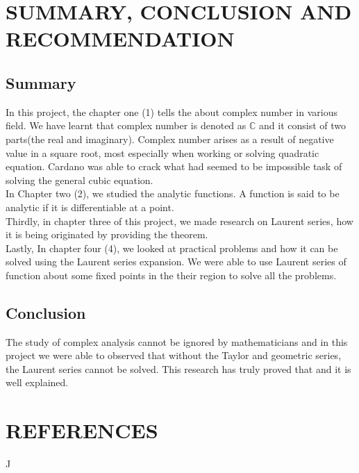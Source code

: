 \documentclass[11pt]{report}
\newcommand{\NI}{\noindent}
\newcommand{\complex}{\mathbb{C}}
\begin{document}
	
	\chapter{SUMMARY, CONCLUSION AND RECOMMENDATION}
	\section{Summary}
	In this project, the chapter one (1) tells the about complex number in various field. We have learnt that complex number is denoted as $\complex$ and it consist of two parts(the real and imaginary). Complex number arises as a result of negative value in a square root, most especially when working or solving quadratic equation. Cardano was able to crack what had seemed to be impossible task of solving the general cubic equation.\\
	
	\NI In Chapter two (2), we studied the analytic functions. A function is said to be analytic if it is differentiable at a point.\\
	
	\NI Thirdly, in chapter three of this project, we made research on Laurent series, how it is being originated by providing the theorem.\\
	
	\NI Lastly, In chapter four (4), we looked at practical problems and how it can be solved using the Laurent series expansion. We were able to use Laurent series of function about some fixed points in the their region to solve all the problems.
	\section{Conclusion}
	The study of complex analysis cannot be ignored by mathematicians and in this project we were able to observed that without the Taylor and geometric series, the Laurent series cannot be solved. This research has truly proved that and it is well explained.
	

	
	\chapter*{REFERENCES}
	
	\begin{description}
		\item J
		
	\end{description}
	
\end{document}
